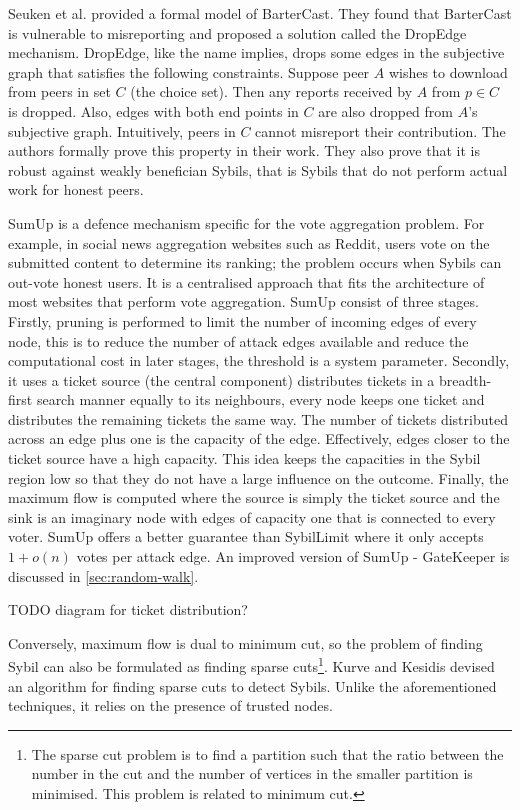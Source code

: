 Seuken et al. provided a formal model of BarterCast. They found that BarterCast
is vulnerable to misreporting and proposed a solution called the DropEdge
mechanism\cite{seuken2011sybil, seuken2014sybil}. DropEdge, like the name
implies, drops some edges in the subjective graph that satisfies the following
constraints. Suppose peer $A$ wishes to download from peers in set $C$ (the
choice set). Then any reports received by $A$ from $p \in C$ is dropped. Also,
edges with both end points in $C$ are also dropped from $A$'s subjective graph.
Intuitively, peers in $C$ cannot misreport their contribution. The authors
formally prove this property in their work. They also prove that it is robust
against weakly benefician Sybils, that is Sybils that do not perform actual work
for honest peers.

SumUp\cite{tran2009sybil} is a defence mechanism specific for the vote
aggregation problem. For example, in social news aggregation websites such as
Reddit, users vote on the submitted content to determine its ranking; the
problem occurs when Sybils can out-vote honest users. It is a centralised
approach that fits the architecture of most websites that perform vote
aggregation. SumUp consist of three stages. Firstly, pruning is performed to
limit the number of incoming edges of every node, this is to reduce the number
of attack edges available and reduce the computational cost in later stages, the
threshold is a system parameter. Secondly, it uses a ticket source (the central
component) distributes tickets in a breadth-first search manner equally to its
neighbours, every node keeps one ticket and distributes the remaining tickets
the same way. The number of tickets distributed across an edge plus one is the
capacity of the edge. Effectively, edges closer to the ticket source have a high
capacity. This idea keeps the capacities in the Sybil region low so that they do
not have a large influence on the outcome. Finally, the maximum flow is computed
where the source is simply the ticket source and the sink is an imaginary node
with edges of capacity one that is connected to every voter. SumUp offers a
better guarantee than SybilLimit where it only accepts $1 + o(n)$ votes per
attack edge. An improved version of SumUp - GateKeeper is discussed in
\autoref{sec:random-walk}.

TODO diagram for ticket distribution?

Conversely, maximum flow is dual to minimum cut, so the problem of finding Sybil
can also be formulated as finding sparse cuts\footnote{The sparse cut problem is
  to find a partition such that the ratio between the number in the cut and the
  number of vertices in the smaller partition is minimised. This problem is
  related to minimum cut.}. Kurve and Kesidis devised an algorithm for finding
sparse cuts to detect Sybils\cite{kurve2011sybil}. Unlike the aforementioned
techniques, it relies on the presence of trusted nodes.

